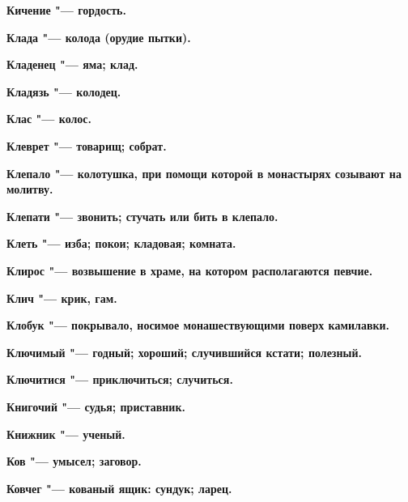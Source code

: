\bfseries Кичение \normalfont{} "--- гордость. 




\bfseries Клада \normalfont{} "--- колода (орудие пытки). 




\bfseries Кладенец \normalfont{} "--- яма; клад. 




\bfseries Кладязь \normalfont{} "--- колодец. 




\bfseries Клас \normalfont{} "--- колос. 




\bfseries Клеврет \normalfont{} "--- товарищ; собрат. 




\bfseries Клепало \normalfont{} "--- колотушка, при помощи которой в монастырях созывают на молитву. 




\bfseries Клепати \normalfont{} "--- звонить; стучать или бить в клепало. 




\bfseries Клеть \normalfont{} "--- изба; покои; кладовая; комната. 




\bfseries Клирос \normalfont{} "--- возвышение в храме, на котором располагаются певчие. 




\bfseries Клич \normalfont{} "--- крик, гам. 




\bfseries Клобук \normalfont{} "--- покрывало, носимое монашествующими поверх камилавки. 




\bfseries Ключимый \normalfont{} "--- годный; хороший; случившийся кстати; полезный. 




\bfseries Ключитися \normalfont{} "--- приключиться; случиться. 




\bfseries Книгочий \normalfont{} "--- судья; приставник. 




\bfseries Книжник \normalfont{} "--- ученый. 




\bfseries Ков \normalfont{} "--- умысел; заговор. 




\bfseries Ковчег \normalfont{} "--- кованый ящик: сундук; ларец. 




